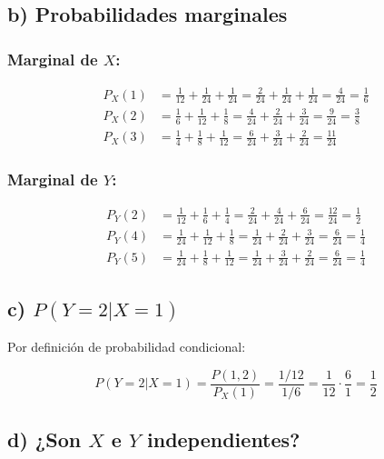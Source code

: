 \documentclass{article}
\begin{document}
\subsection*{b) Probabilidades marginales}

\subsubsection*{Marginal de \(X\):}

\[
\begin{aligned}
P_X(1) &= \frac{1}{12} + \frac{1}{24} + \frac{1}{24} = \frac{2}{24} + \frac{1}{24} + \frac{1}{24} = \frac{4}{24} = \frac{1}{6} \\
P_X(2) &= \frac{1}{6} + \frac{1}{12} + \frac{1}{8} = \frac{4}{24} + \frac{2}{24} + \frac{3}{24} = \frac{9}{24} = \frac{3}{8} \\
P_X(3) &= \frac{1}{4} + \frac{1}{8} + \frac{1}{12} = \frac{6}{24} + \frac{3}{24} + \frac{2}{24} = \frac{11}{24}
\end{aligned}
\]

\subsubsection*{Marginal de \(Y\):}

\[
\begin{aligned}
P_Y(2) &= \frac{1}{12} + \frac{1}{6} + \frac{1}{4} = \frac{2}{24} + \frac{4}{24} + \frac{6}{24} = \frac{12}{24} = \frac{1}{2} \\
P_Y(4) &= \frac{1}{24} + \frac{1}{12} + \frac{1}{8} = \frac{1}{24} + \frac{2}{24} + \frac{3}{24} = \frac{6}{24} = \frac{1}{4} \\
P_Y(5) &= \frac{1}{24} + \frac{1}{8} + \frac{1}{12} = \frac{1}{24} + \frac{3}{24} + \frac{2}{24} = \frac{6}{24} = \frac{1}{4}
\end{aligned}
\]

\subsection*{c) \(P(Y = 2 | X = 1)\)}

Por definición de probabilidad condicional:

\[
P(Y = 2|X = 1) = \frac{P(1,2)}{P_X(1)} = \frac{1/12}{1/6} = \frac{1}{12} \cdot \frac{6}{1} = \frac{1}{2}
\]

\subsection*{d) ¿Son \(X\) e \(Y\) independientes?}
\end{document}
